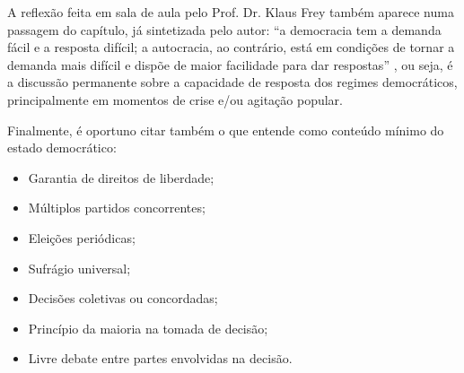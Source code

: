 \documentclass[
article,			%
11pt,				%
oneside,			%
a4paper,			%
english,			%
brazil,				%
sumario=tradicional
]{abntex2}
\begin{document}
	A reflexão feita em sala de aula pelo Prof. Dr. Klaus Frey também aparece numa passagem do capítulo, já sintetizada pelo autor: ``a democracia tem a demanda fácil e a resposta difícil; a autocracia, ao contrário, está em condições de tornar a demanda mais difícil e dispõe de maior facilidade para dar respostas'' \cite[p. 20]{bobbio1986a}, ou seja, é a discussão permanente sobre a capacidade de resposta dos regimes democráticos, principalmente em momentos de crise e/ou agitação popular.
	
	Finalmente, é oportuno citar também o que  entende como conteúdo mínimo do estado democrático:
	
	\begin{itemize}
		\item Garantia de direitos de liberdade;
		\item Múltiplos partidos concorrentes;
		\item Eleições periódicas;
		\item Sufrágio universal;
		\item Decisões coletivas ou concordadas;
		\item Princípio da maioria na tomada de decisão;
		\item Livre debate entre partes envolvidas na decisão.
	\end{itemize}
	
	
	\postextual
	
	
	
	\renewcommand{\glossaryname}{Glossário}
	\renewcommand*{\glsseeformat}[3][\seename]{\textit{#1}
		\glsseelist{#2}}
	
	
\end{document}
